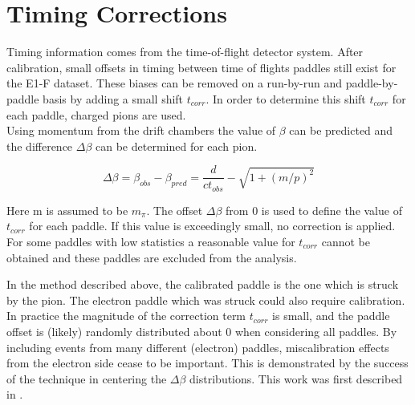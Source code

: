 \section{Timing Corrections}
Timing information comes from the time-of-flight detector system.  After calibration, small offsets in timing between time of flights paddles still exist for the E1-F dataset.  These biases can be removed on a run-by-run and paddle-by-paddle basis by adding a small shift $t_{corr}$.  In order to determine this shift $t_{corr}$ for each paddle, charged pions are used.  \\

Using momentum from the drift chambers the value of $\beta$ can be predicted and the difference $\Delta \beta$ can be determined for each pion. 

\begin{equation}
	\Delta \beta = \beta_{obs} - \beta_{pred} = \frac{d}{c t_{obs}} - \sqrt{1+(m/p)^2} 
\end{equation} 

Here m is assumed to be $m_{\pi}$.  The offset $\Delta \beta$ from 0 is used to define the value of $t_{corr}$ for each paddle.  If this value is exceedingly small, no correction is applied.  For some paddles with low statistics a reasonable value for $t_{corr}$ cannot be obtained and these paddles are excluded from the analysis.  \\


In the method described above, the calibrated paddle is the one which is struck by the pion.  The electron paddle which was struck could also require calibration.  In practice the magnitude of the correction term $t_{corr}$ is small, and the paddle offset is (likely) randomly distributed about 0 when considering all paddles.  By including events from many different (electron) paddles, miscalibration effects from the electron side cease to be important.  This is demonstrated by the success of the technique in centering the $\Delta \beta$ distributions.  This work was first described in \cite{theses-harrison:2015}. \\

